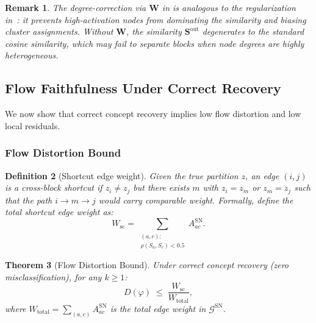 \documentclass[11pt]{article}
\newtheorem{theorem}{Theorem}[section]
\newtheorem{definition}[theorem]{Definition}
\newtheorem{remark}[theorem]{Remark}
\newcommand{\cG}{\mathcal{G}}
\newcommand{\bS}{\mathbf{S}}
\newcommand{\bW}{\mathbf{W}}
\newcommand{\1}{\mathbbm{1}}
\begin{document}
\begin{remark}
  The degree-correction via $\bW$ in  is analogous to the regularization in~\citet{qin2013regularized}: it prevents high-activation nodes from dominating the similarity and biasing cluster assignments.
  Without $\bW$, the similarity $\bS^{\mathrm{out}}$ degenerates to the standard cosine similarity, which may fail to separate blocks when node degrees are highly heterogeneous.
\end{remark}

\subsection{Flow Faithfulness Under Correct Recovery}
\label{sec:flow-theory}

We now show that correct concept recovery implies low flow distortion and low local residuals.

\subsubsection{Flow Distortion Bound}

\begin{definition}[Shortcut edge weight]
  Given the true partition $z$, an edge $(i,j)$ is a \emph{cross-block shortcut} if $z_i \ne z_j$ but there exists $m$ with $z_i = z_m$ or $z_m = z_j$ such that the path $i \to m \to j$ would carry comparable weight.
  Formally, define the total shortcut edge weight as:
  \[
    W_{\mathrm{sc}} = \sum_{\substack{(a,c):\\ \rho(S_a, S_c) < 0.5}} A^{\mathrm{SN}}_{ac}.
  \]
\end{definition}

\begin{theorem}[Flow Distortion Bound]
\label{thm:flow-distortion}
  Under correct concept recovery (zero misclassification), for any $k \ge 1$:
  \begin{equation}
    D(\varphi) \;\le\; \frac{W_{\mathrm{sc}}}{W_{\mathrm{total}}},
    \label{eq:D-bound}
  \end{equation}
  where $W_{\mathrm{total}} = \sum_{(a,c)} A^{\mathrm{SN}}_{ac}$ is the total edge weight in $\cG^{\mathrm{SN}}$.
\end{theorem}
\end{document}
